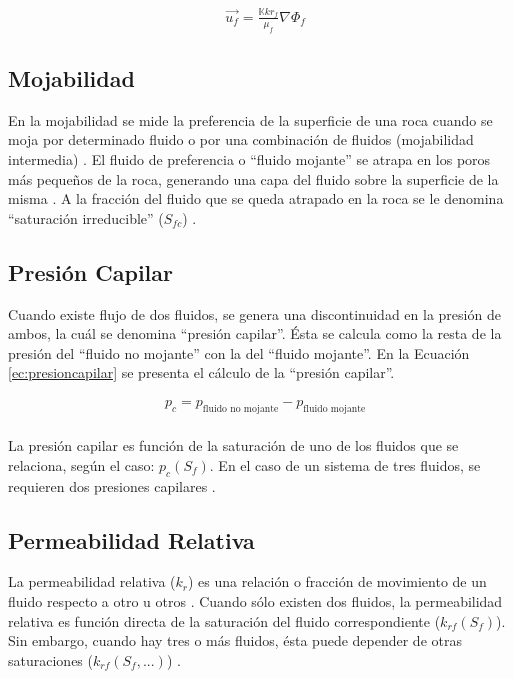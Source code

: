\begin{align}
\label{ec:DarcyMultifasico} & \vec{u_{f}}=\frac{\mathbb{K}kr_{f}}{\mu_{f} } \nabla{\Phi_{f}}
\end{align}

\subsection{Mojabilidad}\label{subsec:Wettability}
En la mojabilidad se mide la preferencia de la superficie de una roca cuando se moja por determinado fluido o por una combinación de fluidos (mojabilidad intermedia) \citep{chen2007reservoir}. El fluido de preferencia o ``fluido mojante'' se atrapa en los poros más pequeños de la roca, generando una capa del fluido sobre la superficie de la misma \citep{chen2007reservoir}. A la fracción del fluido que se queda atrapado en la roca se le denomina ``saturación irreducible'' ($S_{fc}$) \citep{chen2007reservoir}. \\

\subsection{Presión Capilar}\label{subsec:Capillary}
Cuando existe flujo de dos fluidos, se genera una discontinuidad en la presión de ambos, la cuál se denomina ``presión capilar''. Ésta se calcula como la resta de la presión del ``fluido no mojante'' con la del ``fluido mojante''\citep{chen2007reservoir, FANCHI2002108}. En la Ecuación \ref{ec:presioncapilar} se presenta el cálculo de la ``presión capilar''.

\begin{align}
	\label{ec:presioncapilar}&p_c = p_{\text{fluido no mojante}} - p_{\text{fluido mojante}}
\end{align}\\

La presión capilar es función de la saturación de uno de los fluidos que se relaciona, según el caso: $p_c(S_{f})$. En el caso de un sistema de tres fluidos, se requieren dos presiones capilares \citep{chen2007reservoir}.

\subsection{Permeabilidad Relativa}\label{subsec:Krs}
La permeabilidad relativa ($k_{r}$) es una relación o fracción de movimiento de un fluido respecto a otro u otros \citep{chen2007reservoir}. Cuando sólo existen dos fluidos, la permeabilidad relativa es función directa de la saturación del fluido correspondiente ($k_{rf}(S_{f})$). Sin embargo, cuando hay tres o más fluidos, ésta puede depender de otras saturaciones ($k_{rf}(S_{f}, ...)$) \citep{chen2007reservoir}.


